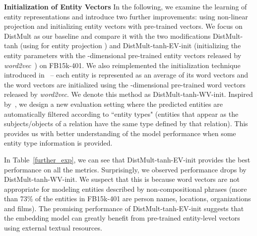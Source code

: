 \documentclass{article} \usepackage{iclr2015,times}
\begin{document}
\textbf{Initialization of Entity Vectors} In the following, we examine the learning of entity representations and introduce two further improvements: using non-linear projection and initializing entity vectors with pre-trained vectors. We focus on {\sc DistMult} as our baseline and compare it with the two modifications {\sc DistMult}-tanh (using  for entity projection
) and {\sc DistMult}-tanh-EV-init (initializing the entity parameters with the -dimensional pre-trained entity vectors released by \textit{word2vec}~\citep{mikolov2013distributed}) on FB15k-401. We also reimplemented the initialization technique introduced in~\citep{SocherChenManningNg2013} -- each entity is represented as an average of its word vectors and the word vectors are initialized using the -dimensional pre-trained word vectors released by \textit{word2vec}. We denote this method as {\sc DistMult}-tanh-WV-init. Inspired by~\citep{CYYM14}, we design a new evaluation setting where the predicted entities are automatically filtered according to ``entity types" (entities that appear as the subjects/objects of a relation have the same type defined by that relation). This provides us with better understanding of the model performance when some entity type information is provided. 
\begin{table*}[bth]
\begin{center}
\caption{\label{further_exp}Evaluation with pre-trained vectors}
\end{center}
\end{table*}

In Table~\ref{further_exp}, we can see that {\sc DistMult}-tanh-EV-init provides the best performance on all the metrics. Surprisingly, we observed performance drops by {\sc DistMult}-tanh-WV-init. We suspect that this is because word vectors are not appropriate for modeling entities described by non-compositional phrases (more than 73\% of the entities in FB15k-401 are person names, locations, organizations and films). The promising performance of {\sc DistMult}-tanh-EV-init suggests that the embedding model can greatly benefit from pre-trained entity-level vectors using external textual resources. 
\end{document}
